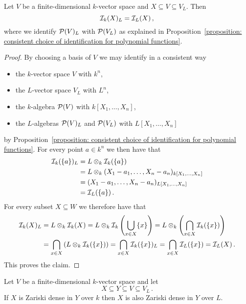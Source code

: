 \begin{corollary}
  Let $V$ be a finite-dimensional $k$-vector space and $X \subseteq V \subseteq V_L$.
  Then
  \[
      \mathcal{I}_k(X)_L
    = \mathcal{I}_L(X) \,,
  \]
  where we identify $\mathcal{P}(V)_L$ with $\mathcal{P}(V_L)$ as explained in Proposition~\ref{proposition: consistent choice of identification for polynomial functions}.
\end{corollary}


\begin{proof}
  By choosing a basis of $V$ we may identify in a consistent way
  \begin{itemize}
    \item
      the $k$-vector space $V$ with $k^n$,
    \item
      the $L$-vector space $V_L$ with $L^n$,
    \item
      the $k$-algebra $\mathcal{P}(V)$ with $k[X_1, \dotsc, X_n]$,
    \item
      the $L$-algebras $\mathcal{P}(V)_L$ and $\mathcal{P}(V_L)$ with $L[X_1, \dotsc, X_n]$
  \end{itemize}
  by Proposition~\ref{proposition: consistent choice of identification for polynomial functions}.
  For every point $a \in k^n$ we then have that
  \begin{align*}
        \mathcal{I}_k(\{a\})_L
    &=  L \otimes_k \mathcal{I}_k(\{a\}) \\
    &=  L \otimes_k ( X_1 - a_1, \dotsc, X_n - a_n )_{ k[X_1, \dotsc, X_n] } \\
    &=  ( X_1 - a_1, \dotsc, X_n - a_n )_{ L[X_1, \dotsc, X_n] }  \\
    &=  \mathcal{I}_L(\{a\}) \,.
  \end{align*}
  For every subset $X \subseteq W$ we therefore have that
  \begin{align*}
        \mathcal{I}_k(X)_L
    &=  L \otimes_k \mathcal{I}_k(X)
     =  L \otimes_k \mathcal{I}_k\left( \bigcup_{x \in X} \{x\} \right)
     =  L \otimes_k \left( \bigcap_{x \in X} \mathcal{I}_k(\{x\}) \right)  \\
    &=  \bigcap_{x \in X} \left( L \otimes_k \mathcal{I}_k(\{x\}) \right)
     =  \bigcap_{x \in X} \mathcal{I}_k(\{x\})_L
     =  \bigcap_{x \in X} \mathcal{I}_L(\{x\})
     =  \mathcal{I}_L(X) \,.
  \end{align*}
  This proves the claim.
\end{proof}


\begin{corollary}
  \label{corollary: Zariski dense scalar extension}
  Let $V$ be a finite-dimensional $k$-vector space and let
  \[
              X
    \subseteq Y
    \subseteq V
    \subseteq V_L \,.
  \]
  If $X$ is Zariski dense in $Y$ over $k$ then $X$ is also Zariski dense in $Y$ over $L$.
\end{corollary}


